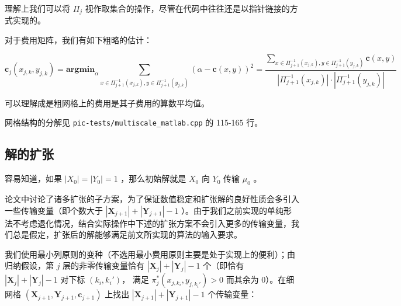 \documentclass[]{article}
\begin{document}
理解上我们可以将 \(\Pi_j\)
视作取集合的操作，尽管在代码中往往还是以指针链接的方式实现的。

对于费用矩阵，我们有如下粗略的估计：

\[\mathbf{c}_j(x_{j, k}, y_{j, k}) = \textbf{argmin}_\alpha \sum_{x\in\Pi_{j+1}^{-1}(x_{j, k}), y\in\Pi_{j+1}^{-1}(y_{j, k})} \left( \alpha - \mathbf{c}(x, y) \right)^2 = \frac{ \sum_{x\in\Pi_{j+1}^{-1}(x_{j, k}), y\in\Pi_{j+1}^{-1}(y_{j, k})} \mathbf{c}(x, y)}{|\Pi_{j+1}^{-1}(x_{j, k})|\cdot|\Pi_{j+1}^{-1}(y_{j, k})|}\]

可以理解成是粗网格上的费用是其子费用的算数平均值。

网格结构的分解见 \texttt{pic-tests/multiscale\_matlab.cpp} 的 115-165
行。

\subsection{解的扩张}

容易知道，如果 \(|X_0|=|Y_0|=1\) ，那么初始解就是 \(X_0\) 向 \(Y_0\)
传输 \(\mu_0\) 。

论文中讨论了诸多扩张的子方案，为了保证数值稳定和扩张解的良好性质会多引入一些传输变量（即个数大于
\(|\mathbf{X}_{j+1}|+|\mathbf{Y}_{j+1}|-1\)
）。由于我们之前实现的单纯形法不考虑退化情况，结合实际操作中下述的扩张方案不会引入更多的传输变量，我们总是假定，扩张后的解能够满足前文所实现的算法的输入要求。

我们使用最小列原则的变种（不选用最小费用原则主要是处于实现上的便利）；由归纳假设，第
\(j\) 层的非零传输变量恰有 \(|\mathbf{X}_{j}|+|\mathbf{Y}_{j}|-1\)
个（即恰有 \(|\mathbf{X}_{j}|+|\mathbf{Y}_{j}|-1\) 对下标
\((k_i,k_i')\)， 满足 \(\pi_j^*(x_{j ,k_i},y_{j, k_i'}) > 0\) 而其余为
\(0\)）。在细网格
\((\mathbf{X}_{j+1}, \mathbf{Y}_{j+1}, \mathbf{c}_{j+1})\) 上找出
\(|\mathbf{X}_{j+1}|+|\mathbf{Y}_{j+1}|-1\) 个传输变量：
\end{document}
